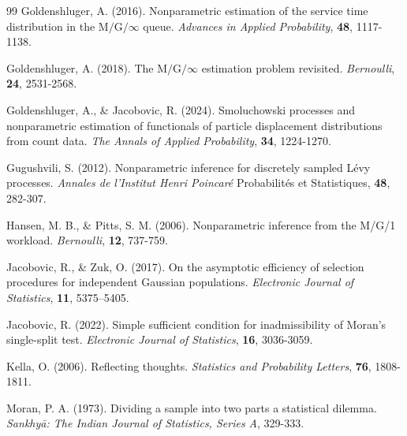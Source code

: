 \documentclass[12pt]{article}
\newcommand{\1}{\mathbf{1}}
\begin{document}
\begin{thebibliography}{99}
Goldenshluger, A. (2016). Nonparametric estimation of the service time distribution in the $\text{M/G/}\infty$ queue. \textit{Advances in Applied Probability}, \textbf{48}, 1117-1138.

Goldenshluger, A. (2018). The $\text{M/G/}\infty$ estimation problem revisited. \textit{Bernoulli}, \textbf{24}, 2531-2568.
 
Goldenshluger, A., \& Jacobovic, R. (2024). Smoluchowski processes and nonparametric estimation of functionals of particle displacement distributions from count data. \textit{The Annals of Applied Probability}, \textbf{34}, 1224-1270.

Gugushvili, S. (2012). Nonparametric inference for discretely sampled Lévy processes. \textit{Annales de l’Institut Henri Poincar\'e} Probabilit\'es et Statistiques, \textbf{48}, 282-307.

 Hansen, M. B., \& Pitts, S. M. (2006). Nonparametric inference from the M/G/1 workload. \textit{Bernoulli}, \textbf{12}, 737-759.


Jacobovic, R., \& Zuk, O. (2017). On the asymptotic efficiency of selection procedures for independent Gaussian populations. \textit{Electronic Journal of Statistics}, \textbf{11}, 5375–5405.

Jacobovic, R. (2022). Simple sufficient condition for inadmissibility of Moran’s single-split test. \textit{Electronic Journal of Statistics}, \textbf{16}, 3036-3059.

Kella, O. (2006). Reflecting thoughts. \textit{Statistics and Probability Letters}, \textbf{76}, 1808-1811.

Moran, P. A. (1973). Dividing a sample into two parts a statistical dilemma. \textit{Sankhy{\=a}: The Indian Journal of Statistics, Series A}, 329-333.


\end{thebibliography}
\end{document}

